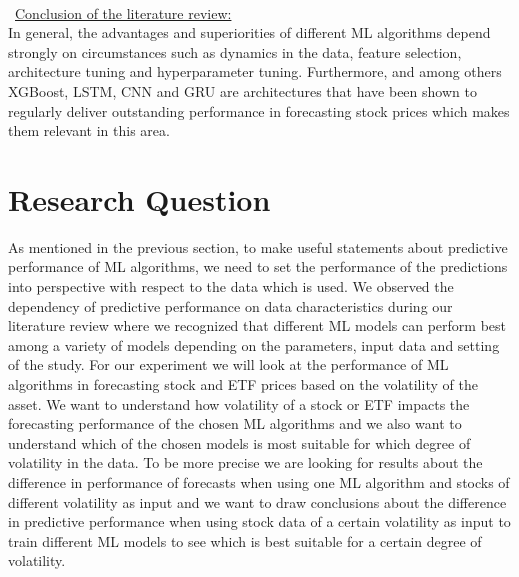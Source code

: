 \documentclass[a4paper,12pt]{report}
\begin{document}
\\\
\underline{Conclusion of the literature review:} \\
In general, the advantages and superiorities of different ML algorithms depend strongly on circumstances such as dynamics in the data, feature selection, architecture tuning and hyperparameter tuning. Furthermore, and among others XGBoost, LSTM, CNN and GRU are architectures that have been shown to regularly deliver outstanding performance in forecasting stock prices which makes them relevant in this area.

\chapter{Research Question}
As mentioned in the previous section, to make useful statements about predictive performance of ML algorithms, we need to set the performance of the predictions into perspective with respect to the data which is used. We observed the dependency of predictive performance on data characteristics during our literature review where we recognized that different ML models can perform best among a variety of models depending on the parameters, input data and setting of the study. For our experiment we will look at the performance of ML algorithms in forecasting stock and ETF prices based on the volatility of the asset. We want to understand how volatility of a stock or ETF impacts the forecasting performance of the chosen ML algorithms and we also want to understand which of the chosen models is most suitable for which degree of volatility in the data. To be more precise we are looking for results about the difference in performance of forecasts when using one ML algorithm and stocks of different volatility as input and we want to draw conclusions about the difference in predictive performance when using stock data of a certain volatility as input to train different ML models to see which is best suitable for a certain degree of volatility.
\end{document}
